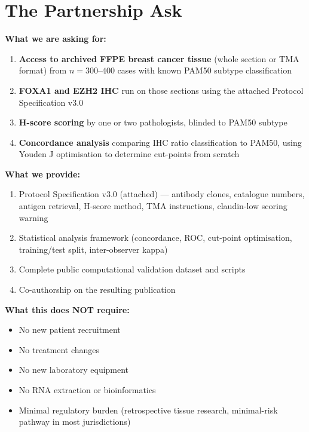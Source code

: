 \documentclass[11pt, a4paper]{article}
\begin{document}
\section{The Partnership Ask}

\begin{mdframed}[backgroundcolor=askbox,
                 linecolor=blue!50!black,
                 linewidth=1.5pt]
\textbf{What we are asking for:}
\begin{enumerate}
    \item \textbf{Access to archived FFPE
    breast cancer tissue} (whole section
    or TMA format) from $n=300$--$400$
    cases with known PAM50 subtype
    classification
    \item \textbf{FOXA1 and EZH2 IHC} run
    on those sections using the attached
    Protocol Specification v3.0
    \item \textbf{H-score scoring} by one
    or two pathologists, blinded to PAM50
    subtype
    \item \textbf{Concordance analysis}
    comparing IHC ratio classification
    to PAM50, using Youden J optimisation
    to determine cut-points from scratch
\end{enumerate}

\textbf{What we provide:}
\begin{enumerate}
    \item Protocol Specification v3.0
    (attached) --- antibody clones,
    catalogue numbers, antigen retrieval,
    H-score method, TMA instructions,
    claudin-low scoring warning
    \item Statistical analysis framework
    (concordance, ROC, cut-point
    optimisation, training/test split,
    inter-observer kappa)
    \item Complete public computational
    validation dataset and scripts
    \item Co-authorship on the resulting
    publication
\end{enumerate}

\textbf{What this does NOT require:}
\begin{itemize}[noitemsep]
    \item No new patient recruitment
    \item No treatment changes
    \item No new laboratory equipment
    \item No RNA extraction or
    bioinformatics
    \item Minimal regulatory burden
    (retrospective tissue research,
    minimal-risk pathway in most
    jurisdictions)
\end{itemize}
\end{mdframed}
\end{document}
